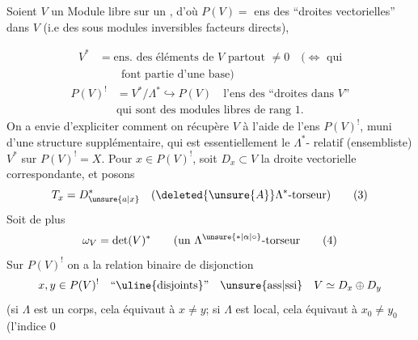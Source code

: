 Soient $V$ un Module  libre  sur un , d'où $P(V)=$ ens des ``droites vectorielles'' dans $V$ (i.e des sous modules   inversibles facteurs directs),


\[
\begin{aligned}
V^*&=\text{ens. des éléments de }V\text{ partout }\ne0\quad(\Longleftrightarrow\text{ qui}\\
&\hspace{2em}\text{font partie d'une base})
\end{aligned}
\tag*{(1)}
\]
\[
\begin{aligned}
P(V)^!&=V^*/\Lambda^*\hookrightarrow P(V)\quad\text{l'ens des ``droites dans }V\text{''}\\
&\text{qui sont des modules libres de rang }1.
\end{aligned}
\tag*{(2)}
\]
On a envie d'expliciter comment on récupère  $V$ à l'aide de l'ens $P(V)^!$, muni d'une structure supplémentaire, qui est  essentiellement le $\Lambda^*$- relatif (ensembliste) $V^*$ sur $P(V)^!=X$. Pour $x\in P(V)^!$, soit $D_x\subset V$ la droite vectorielle correspondante, et posons
\[
T_x=D_{\unsure{a|x}}^*\quad(\deleted{\unsure{A}}\Lambda^*\text{-torseur})
\tag*{(3)}
\]
Soit de plus
\[
\omega_V=\det(V)^*\qquad(\text{un }\Lambda^{\unsure{*|\alpha|\circ}}\text{-torseur}
\tag*{(4)}
\]
Sur $P(V)^!$ on a la relation binaire de disjonction
\[
x,y\in P(V)^!\quad\text{``\uline{disjoints}''}\quad\text{\unsure{ass|ssi}}\quad V\simeq D_x\oplus D_y
\]
(si $\Lambda$ est un corps, cela équivaut à $x\ne y$; si $\Lambda$ est local, cela équivaut à $x_0\ne y_0$ (l'indice $0$
